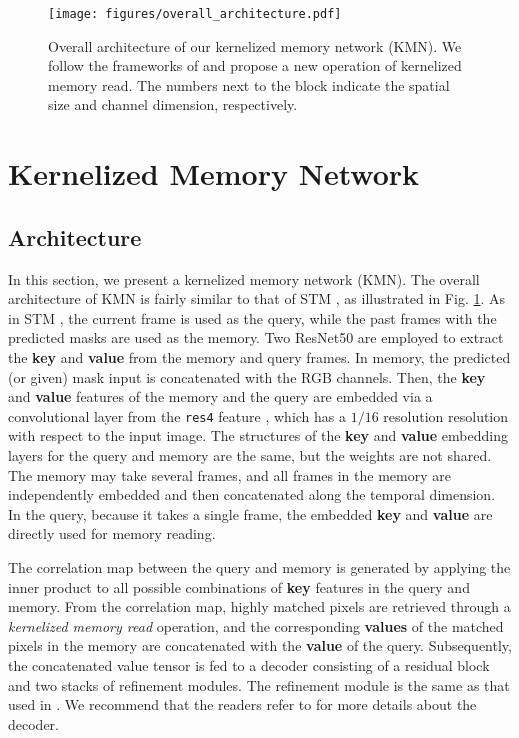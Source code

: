 \begin{figure}[t]
\centering
\texttt{[image: figures/overall\_architecture.pdf]}
\caption{
Overall architecture of our kernelized memory network (KMN). We follow the frameworks of \cite{Oh_2019_ICCV} and propose a new operation of kernelized memory read. The numbers next to the block indicate the spatial size and channel dimension, respectively.
}
\label{fig:overall_architecture}
\end{figure}

\section{Kernelized Memory Network}
\label{s3}

\subsection{Architecture}
\label{s31}
In this section, we present a kernelized memory network (KMN). The overall architecture of KMN is fairly similar to that of STM \cite{Oh_2019_ICCV}, as illustrated in Fig. \ref{fig:overall_architecture}. As in STM \cite{Oh_2019_ICCV}, the current frame is used as the query, while the past frames with the predicted masks are used as the memory. Two ResNet50 \cite{b23} are employed to extract the \textbf{key} and \textbf{value} from the memory and query frames. In memory, the predicted (or given) mask input is concatenated with the RGB channels. Then, the \textbf{key} and \textbf{value} features of the memory and the query are embedded via a convolutional layer from the \texttt{res4} feature \cite{b23}, which has a $1/16$ resolution resolution with respect to the input image. The structures of the \textbf{key} and \textbf{value} embedding layers for the query and memory are the same, but the weights are not shared. The memory may take several frames, and all frames in the memory are independently embedded and then concatenated along the temporal dimension. In the query, because it takes a single frame, the embedded \textbf{key} and \textbf{value} are directly used for memory reading.

The correlation map between the query and memory is generated by applying the inner product to all possible combinations of \textbf{key} features in the query and memory. From the correlation map, highly matched pixels are retrieved through a \textit{kernelized memory read} operation, and the corresponding \textbf{values} of the matched pixels in the memory are concatenated with the \textbf{value} of the query. Subsequently, the concatenated value tensor is fed to a decoder consisting of a residual block \cite{he2016identity} and two stacks of refinement modules. The refinement module is the same as that used in \cite{Oh_2019_ICCV,wug2018fast}. We recommend that the readers refer to \cite{Oh_2019_ICCV} for more details about the decoder.

